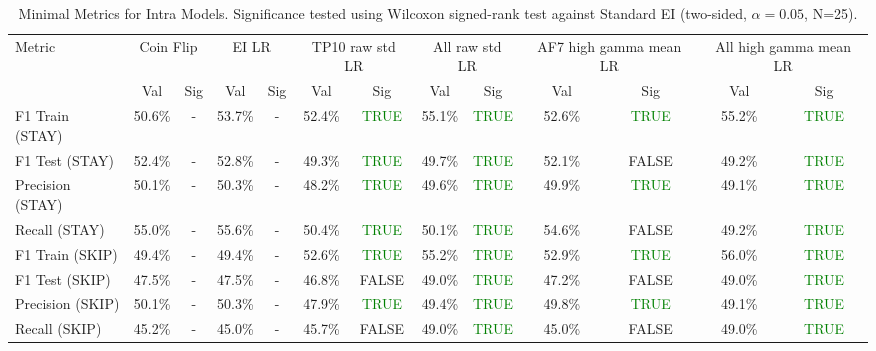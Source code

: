 \begin{table}[ht]
\centering
\begin{tabular}{lcccccccccccc}
\hline
Metric & \multicolumn{2}{c}{Coin Flip} & \multicolumn{2}{c}{EI LR} & \multicolumn{2}{c}{TP10 raw std LR} & \multicolumn{2}{c}{All raw std LR} & \multicolumn{2}{c}{AF7 high gamma mean LR} & \multicolumn{2}{c}{All high gamma mean LR} \\
 & Val & Sig & Val & Sig & Val & Sig & Val & Sig & Val & Sig & Val & Sig \\
\hline
F1 Train (STAY) & 50.6\% & - & 53.7\% & - & 52.4\% & \textcolor{green}{TRUE} & 55.1\% & \textcolor{green}{TRUE} & 52.6\% & \textcolor{green}{TRUE} & 55.2\% & \textcolor{green}{TRUE} \\
F1 Test (STAY) & 52.4\% & - & 52.8\% & - & 49.3\% & \textcolor{green}{TRUE} & 49.7\% & \textcolor{green}{TRUE} & 52.1\% & FALSE & 49.2\% & \textcolor{green}{TRUE} \\
Precision (STAY) & 50.1\% & - & 50.3\% & - & 48.2\% & \textcolor{green}{TRUE} & 49.6\% & \textcolor{green}{TRUE} & 49.9\% & \textcolor{green}{TRUE} & 49.1\% & \textcolor{green}{TRUE} \\
Recall (STAY) & 55.0\% & - & 55.6\% & - & 50.4\% & \textcolor{green}{TRUE} & 50.1\% & \textcolor{green}{TRUE} & 54.6\% & FALSE & 49.2\% & \textcolor{green}{TRUE} \\
F1 Train (SKIP) & 49.4\% & - & 49.4\% & - & 52.6\% & \textcolor{green}{TRUE} & 55.2\% & \textcolor{green}{TRUE} & 52.9\% & \textcolor{green}{TRUE} & 56.0\% & \textcolor{green}{TRUE} \\
F1 Test (SKIP) & 47.5\% & - & 47.5\% & - & 46.8\% & FALSE & 49.0\% & \textcolor{green}{TRUE} & 47.2\% & FALSE & 49.0\% & \textcolor{green}{TRUE} \\
Precision (SKIP) & 50.1\% & - & 50.3\% & - & 47.9\% & \textcolor{green}{TRUE} & 49.4\% & \textcolor{green}{TRUE} & 49.8\% & \textcolor{green}{TRUE} & 49.1\% & \textcolor{green}{TRUE} \\
Recall (SKIP) & 45.2\% & - & 45.0\% & - & 45.7\% & FALSE & 49.0\% & \textcolor{green}{TRUE} & 45.0\% & FALSE & 49.0\% & \textcolor{green}{TRUE} \\
\hline
\end{tabular}
\caption{Minimal Metrics for Intra Models. Significance tested using Wilcoxon signed-rank test against Standard EI (two-sided, $\alpha=0.05$, N=25).}
\label{tab:metrics_intra_ablation}
\end{table}